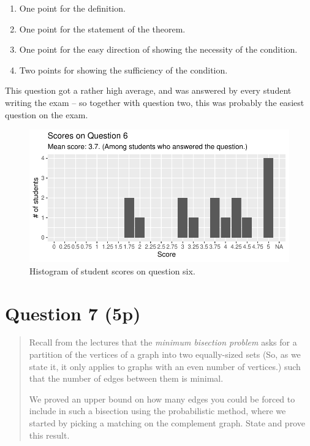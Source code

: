 \documentclass[nobib]{tufte-handout}
\begin{document}
\begin{enumerate}
  \item One point for the definition.
  \item One point for the statement of the theorem.
  \item One point for the easy direction of showing the necessity of the condition.
  \item Two points for showing the sufficiency of the condition.
\end{enumerate}

This question got a rather high average, and was answered by every student writing the exam -- so together with question two, this was probably the easiest question on the exam.

\begin{figure}[p]
  \centering
  \includegraphics[width = \textwidth]{Q6.pdf}
  \caption[Score histogram for Q6]{Histogram of student scores on question six.}
  \label{fig:Q6}
\end{figure}

\section{Question 7 (5p)} %

\begin{quotation}
  Recall from the lectures that the \emph{minimum bisection problem} asks for a partition of the vertices of a graph into two equally-sized sets (So, as we state it, it only applies to graphs with an even number of vertices.) such that the number of edges between them is minimal.

  We proved an upper bound on how many edges you could be forced to include in such a bisection using the probabilistic method, where we started by picking a matching on the complement graph. State and prove this result.
\end{quotation}
\end{document}
